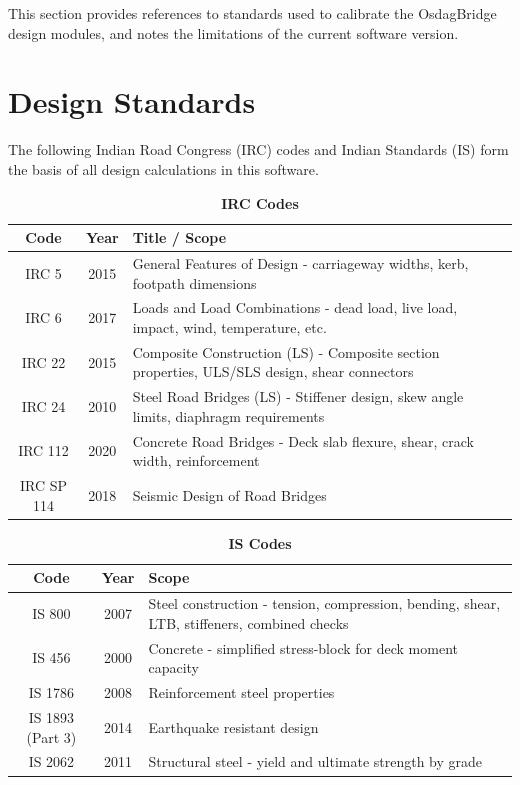 \documentclass[12pt,a4paper]{report}
\numberwithin{table}{chapter}
\numberwithin{figure}{chapter}
\begin{document}
This section provides references to standards used to calibrate the OsdagBridge
design modules, and notes the limitations of the current software version.

\section{Design Standards}
\label{sec:design_standards}

The following Indian Road Congress (IRC) codes and Indian Standards (IS) 
form the basis of all design calculations in this software.

\vspace{0.4cm}

\begingroup
\setlength{\tabcolsep}{3.5pt}
\begin{table}[H]
\caption{\textbf{IRC Codes}}
\begin{tabular}{|c|c|p{13cm}|}
\hline
\textbf{Code} & \textbf{Year} & \textbf{Title / Scope} \\ 
\hline
IRC 5 & 2015 & General Features of Design - carriageway widths, kerb, footpath dimensions \\ 
\hline
IRC 6 & 2017 & Loads and Load Combinations - dead load, live load, impact, wind, temperature, etc. \\ 
\hline
IRC 22 & 2015 & Composite Construction (LS) - Composite section properties, ULS/SLS design, shear connectors \\ 
\hline
IRC 24 & 2010 & Steel Road Bridges (LS) - Stiffener design, skew angle limits, diaphragm requirements \\ 
\hline
IRC 112 & 2020 & Concrete Road Bridges - Deck slab flexure, shear, crack width, reinforcement \\ 
\hline
IRC SP 114 & 2018 & Seismic Design of Road Bridges \\ 
\hline
\end{tabular}
\end{table}

\begingroup
\setlength{\tabcolsep}{3.5pt}
\begin{table}[H]
\caption{\textbf{IS Codes}}
\begin{tabular}{|c|c|p{13cm}|}
\hline
\textbf{Code} & \textbf{Year} & \textbf{Scope} \\
\hline
IS 800 & 2007 & Steel construction - tension, compression, bending, shear, LTB, stiffeners, combined checks \\
\hline
IS 456 & 2000 & Concrete - simplified stress-block for deck moment capacity \\
\hline
IS 1786 & 2008 & Reinforcement steel properties \\
\hline
IS 1893 (Part 3) & 2014 & Earthquake resistant design \\
\hline
IS 2062 & 2011 & Structural steel - yield and ultimate strength by grade \\
\hline
\end{tabular}
\end{table}
\end{document}
